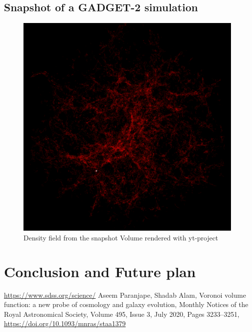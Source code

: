 \documentclass[12pt]{article}
\begin{document}
\subsection{Snapshot of a GADGET-2 simulation}
\cite{aseem_shadab}

\begin{figure}[H]
	\centering
	\includegraphics[width=0.5\linewidth]{../density_assign/UniformGridData_Render_density}
	\caption{Density field from the snapshot \quad
		 Volume rendered with yt-project}
	\label{fig:uniformgriddatarenderdensity}
\end{figure}


\section{Conclusion and Future plan}




\begin{thebibliography}{widest entry}
 \url{https://www.sdss.org/science/}
 Aseem Paranjape, Shadab Alam, Voronoi volume function: a new probe of cosmology and galaxy evolution, Monthly Notices of the Royal Astronomical Society, Volume 495, Issue 3, July 2020, Pages 3233–3251, \url{https://doi.org/10.1093/mnras/staa1379}
\end{thebibliography}
\end{document}
